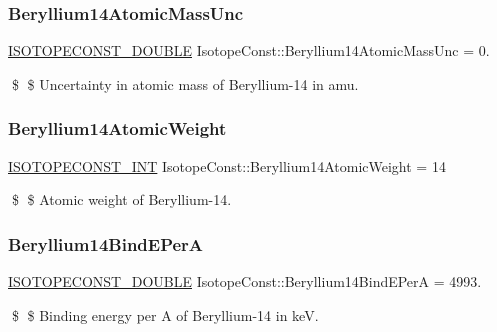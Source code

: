 \subsubsection{\texorpdfstring{Beryllium14\+Atomic\+Mass\+Unc}{Beryllium14AtomicMassUnc}}
{\footnotesize\ttfamily \mbox{\hyperlink{group___isotope_const-_macros_ga8f45a7272ce02c0b4c65c44636ed719a}{I\+S\+O\+T\+O\+P\+E\+C\+O\+N\+S\+T\+\_\+\+D\+O\+U\+B\+LE}} Isotope\+Const\+::\+Beryllium14\+Atomic\+Mass\+Unc = 0.}

\$ \$ Uncertainty in atomic mass of Beryllium-\/14 in amu. \mbox{\label{group___isotope_const-_beryllium-_be14_ga1b4fd31f331e4d88ef6550c97c80ffa9}} 
\subsubsection{\texorpdfstring{Beryllium14\+Atomic\+Weight}{Beryllium14AtomicWeight}}
{\footnotesize\ttfamily \mbox{\hyperlink{group___isotope_const-_macros_ga5f18360b3e99483a35c32d789e62621c}{I\+S\+O\+T\+O\+P\+E\+C\+O\+N\+S\+T\+\_\+\+I\+NT}} Isotope\+Const\+::\+Beryllium14\+Atomic\+Weight = 14}

\$ \$ Atomic weight of Beryllium-\/14. \mbox{\label{group___isotope_const-_beryllium-_be14_gac4da645936db0fd9b9cb26049e408462}} 
\subsubsection{\texorpdfstring{Beryllium14\+Bind\+E\+PerA}{Beryllium14BindEPerA}}
{\footnotesize\ttfamily \mbox{\hyperlink{group___isotope_const-_macros_ga8f45a7272ce02c0b4c65c44636ed719a}{I\+S\+O\+T\+O\+P\+E\+C\+O\+N\+S\+T\+\_\+\+D\+O\+U\+B\+LE}} Isotope\+Const\+::\+Beryllium14\+Bind\+E\+PerA = 4993.}

\$ \$ Binding energy per A of Beryllium-\/14 in keV. \mbox{\label{group___isotope_const-_beryllium-_be14_gabffe21aefcc146c523ed6288bae51b0d}} 
